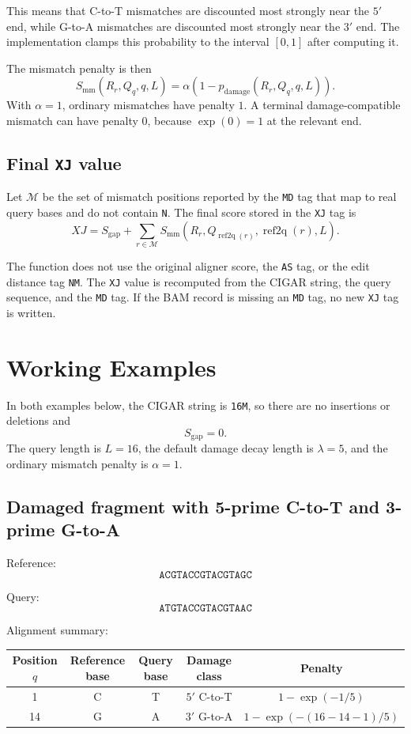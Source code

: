 \documentclass[11pt]{article}
\begin{document}
This means that C-to-T mismatches are discounted most strongly near the $5'$
end, while G-to-A mismatches are discounted most strongly near the $3'$ end.
The implementation clamps this probability to the interval $[0,1]$ after
computing it.

The mismatch penalty is then
\[
S_{\mathrm{mm}}(R_r, Q_q, q, L)
=
\alpha \left(1 - p_{\mathrm{damage}}(R_r, Q_q, q, L)\right).
\]
With $\alpha=1$, ordinary mismatches have penalty $1$. A terminal
damage-compatible mismatch can have penalty $0$, because
$\exp(0)=1$ at the relevant end.

\subsection{Final \texttt{XJ} value}

Let $\mathcal{M}$ be the set of mismatch positions reported by the \texttt{MD}
tag that map to real query bases and do not contain \texttt{N}. The final score
stored in the \texttt{XJ} tag is
\[
XJ
=
S_{\mathrm{gap}}
+
\sum_{r \in \mathcal{M}}
S_{\mathrm{mm}}\left(R_r, Q_{\operatorname{ref2q}(r)},
\operatorname{ref2q}(r), L\right).
\]

The function does not use the original aligner score, the \texttt{AS} tag, or
the edit distance tag \texttt{NM}. The \texttt{XJ} value is recomputed from the
CIGAR string, the query sequence, and the \texttt{MD} tag. If the BAM record is
missing an \texttt{MD} tag, no new \texttt{XJ} tag is written.

\section{Working Examples}

In both examples below, the CIGAR string is \texttt{16M}, so there are no
insertions or deletions and
\[
S_{\mathrm{gap}} = 0.
\]
The query length is $L=16$, the default damage decay length is $\lambda=5$, and
the ordinary mismatch penalty is $\alpha=1$.

\subsection{Damaged fragment with 5-prime C-to-T and 3-prime G-to-A}

Reference:
\[
\texttt{ACGTACCGTACGTAGC}
\]

Query:
\[
\texttt{ATGTACCGTACGTAAC}
\]

Alignment summary:

\begin{center}
\begin{tabular}{c c c c c}
\toprule
Position $q$ & Reference base & Query base & Damage class & Penalty \\
\midrule
1  & C & T & $5'$ C-to-T & $1-\exp(-1/5)$ \\
14 & G & A & $3'$ G-to-A & $1-\exp(-(16-14-1)/5)$ \\
\bottomrule
\end{tabular}
\end{center}
\end{document}
